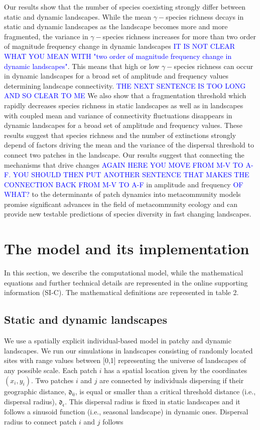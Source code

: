 \documentclass[12pt]{article}
\newcommand{\GM}[1]{\textcolor{Blue}{#1}}
\begin{document}
Our results show that the number of species coexisting strongly differ between static and dynamic landscapes. While the mean $\gamma-$species richness decays in static and dynamic landscapes as the landscape becomes more and more fragmented, the variance in $\gamma-$species richness increases for more than two order of magnitude frequency change in dynamic landscapes \GM{IT IS NOT CLEAR WHAT YOU MEAN WITH "two order of magnitude frequency change in dynamic landscapes"}. This means that high or low $\gamma-$species richness can occur in dynamic landscapes for a broad set of amplitude and frequency values determining landscape connectivity. \GM{THE NEXT SENTENCE IS TOO LONG AND SO CLEAR TO ME} We also show that a fragmentation threshold which rapidly decreases species richness in static landscapes as well as in landscapes with coupled mean and variance of connectivity fluctuations disappears in dynamic landscapes for a broad set of amplitude and frequency values. These results suggest that species richness and the number of extinctions strongly depend of factors driving the mean and the variance of the dispersal threshold to connect two patches in the landscape. Our results suggest that connecting the mechanisms that drive changes \GM{AGAIN HERE YOU MOVE FROM M-V TO A-F. YOU SHOULD THEN PUT ANOTHER SENTENCE THAT MAKES THE CONNECTION BACK FROM M-V TO A-F} in amplitude and frequency \GM{OF WHAT?} to the determinants of patch dynamics into metacommunity models promise significant advances in the field of metacommunity ecology and can provide new testable predictions of species diversity in fast changing landscapes.

\section*{The model and its implementation}

In this section, we describe the computational model, while the
mathematical equations and further technical details are represented
in the online supporting information (SI-C). The mathematical
definitions are represented in table 2.

\subsection*{Static and dynamic landscapes}

We use a spatially explicit individual-based model in patchy and
dynamic landscapes. We run our simulations in landscapes consisting of
randomly located sites with range values between [0,1] representing
the universe of landscapes of any possible scale. Each patch $i$ has a
spatial location given by the coordinates $(x_{i}, y_{i})$. Two
patches $i$ and $j$ are connected by individuals dispersing if their
geographic distance, $\mathfrak{d_{ij}}$, is equal or smaller than a
critical threshold distance (i.e., dispersal radius),
$\mathfrak{d_{c}}$. This dispersal radius is fixed in static
landscapes and it follows a sinusoid function (i.e., seasonal
landscape) in dynamic ones. Dispersal radius to connect patch $i$ and
$j$ follows
\end{document}
